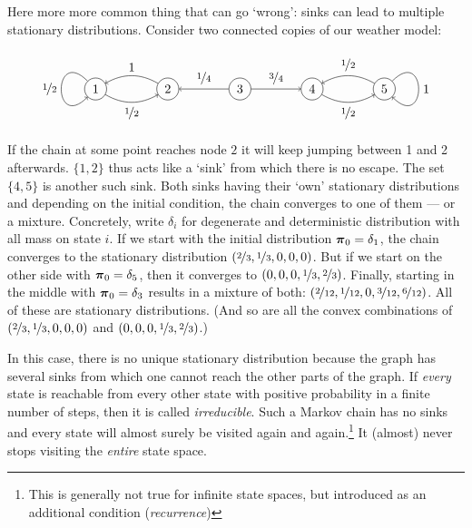 \documentclass{../src/bcthesispart}
\begin{document}
Here more more common thing that can go ‘wrong’: sinks can lead to multiple stationary distributions. 
Consider two connected copies of our weather model:
\begin{equation*}
	\begin{tikzpicture}
		\tikzstyle{line node} = [draw, fill=white, font=\footnotesize ]
	    \node[shape=circle,draw=black] (1) at (0,0) {1};
	    \node[shape=circle,draw=black] (2) at (2,0) {2};
	    \node[shape=circle,draw=black] (3) at (4,0) {3};
	    \node[shape=circle,draw=black] (4) at (6,0) {4};
	    \node[shape=circle,draw=black] (5) at (8,0) {5};
	
	    \path [->](1) edge[bend right] node[midway,below] {$\nicefrac{1}{2}$} (2);
	    \path [->](2) edge[bend right] node[midway,above] {$1$} (1);
	    \path [->](1) edge[out=135,in=225,looseness=8] node[midway,left] {$\nicefrac{1}{2}$} (1);
	    \path [->](3) edge node[midway,above] {$\nicefrac{1}{4}$} (2);
	    \path [->](3) edge node[midway,above] {$\nicefrac{3}{4}$} (4);
	    \path [->](4) edge[bend right] node[midway,below] {$\nicefrac{1}{2}$} (5);
	    \path [->](5) edge[bend right] node[midway,above] {$\nicefrac{1}{2}$} (4);
	    \path [->](5) edge[out=45,in=315,looseness=8] node[midway,right] {$1$} (5); 
	\end{tikzpicture}
\end{equation*}
If the chain at some point reaches node $2$ it will keep jumping between 1 and 2 afterwards. $\{1,2\}$ thus acts like a ‘sink’ from which there is no escape.
The set $\{4,5\}$ is another such sink.
Both sinks having their ‘own’ stationary distributions and
depending on the initial condition, the chain converges to one of them — or a mixture. 
Concretely, write $\delta_i$ for degenerate and deterministic distribution with all mass on state $i$.
If we start with the initial distribution $\boldsymbol{\mathbf{\pi}}_0 = \delta_1$, the chain converges to the stationary distribution $(\nicefrac{2}{3}, \nicefrac{1}{3}, 0, 0, 0)$.
But if we start on the other side with $\boldsymbol{\mathbf{\pi}}_0 = \delta_5$, then it converges to $(0,0,0,\nicefrac{1}{3}, \nicefrac{2}{3})$.
Finally, starting in the middle with $\boldsymbol{\mathbf{\pi}}_0 = \delta_3$ results in a mixture of both: $(\nicefrac{2}{12}, \nicefrac{1}{12}, 0, \nicefrac{3}{12}, \nicefrac{6}{12})$.
All of these are stationary distributions. 
(And so are all the convex combinations of $(\nicefrac{2}{3}, \nicefrac{1}{3}, 0, 0, 0)$ and $(0,0,0,\nicefrac{1}{3}, \nicefrac{2}{3})$.)




In this case, there is no unique stationary distribution because the graph has several sinks from which one cannot reach the other parts of the graph.
If \emph{every} state is reachable from every other state with positive probability in a finite number of steps, then it is called \emph{irreducible}.
Such a Markov chain has no sinks and every state will almost surely be visited again and again.\footnote{%
		This is generally not true for infinite state spaces, but introduced as an additional condition (\emph{recurrence})
	}
It (almost) never stops visiting the \emph{entire} state space.
	
\end{document}
